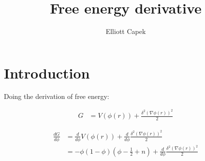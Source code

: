 \documentclass[10pt]{article} %
\title{Free energy derivative}
\author{Elliott Capek}
\begin{document}
\maketitle{}

\section{Introduction}
Doing the derivation of free energy:

\begin{align*}
  G &= V(\phi(r)) + \frac{\delta^2\left(\nabla\phi(r)\right)^2}{2}
\end{align*}

\begin{align*}
  \frac{dG}{d\phi} &= \frac{d}{d\phi}V(\phi(r)) + \frac{d}{d\phi}\frac{\delta^2\left(\nabla\phi(r)\right)^2}{2}\\
  &= -\phi(1-\phi)(\phi-\frac{1}{2}+n) + \frac{d}{d\phi}\frac{\delta^2\left(\nabla\phi(r)\right)^2}{2}\\
\end{align*}
\end{document}
